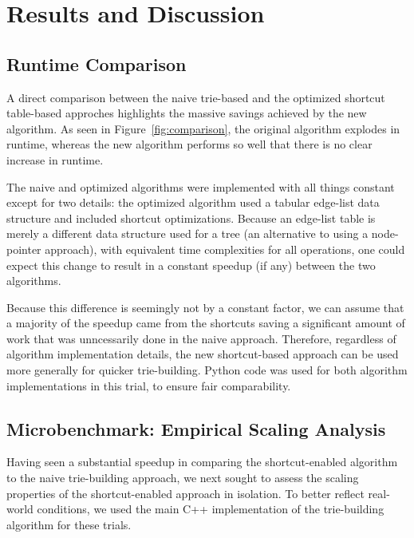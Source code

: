 \section{Results and Discussion} \label{sec:results}

\subsection{Runtime Comparison}

A direct comparison between the naive trie-based and the optimized shortcut table-based approches highlights the massive savings achieved by the new algorithm.
As seen in Figure~\ref{fig:comparison}, the original algorithm explodes in runtime, whereas the new algorithm performs so well that there is no clear increase in runtime.



The naive and optimized algorithms were implemented with all things constant except for two details: the optimized algorithm used a tabular edge-list data structure and included shortcut optimizations.
Because an edge-list table is merely a different data structure used for a tree (an alternative to using a node-pointer approach), with equivalent time complexities for all operations, one could expect this change to result in a constant speedup (if any) between the two algorithms.

Because this difference is seemingly not by a constant factor, we can assume that a majority of the speedup came from the shortcuts saving a significant amount of work that was unncessarily done in the naive approach. 
Therefore, regardless of algorithm implementation details, the new shortcut-based approach can be used more generally for quicker trie-building.
Python code was used for both algorithm implementations in this trial, to ensure fair comparability.

\subsection{Microbenchmark: Empirical Scaling Analysis}



Having seen a substantial speedup in comparing the shortcut-enabled algorithm to the naive trie-building approach, we next sought to assess the scaling properties of the shortcut-enabled approach in isolation.
To better reflect real-world conditions, we used the main C++ implementation of the trie-building algorithm for these trials.

